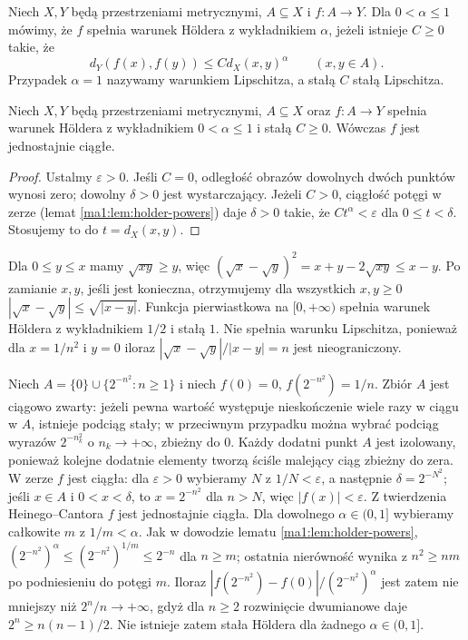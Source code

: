 \begin{definicja}
\label{ma1:def:holder-lipschitz}
Niech $X,Y$ będą przestrzeniami metrycznymi, $A\subseteq X$ i $f:A\to Y$. Dla $0<\alpha\le1$ mówimy, że $f$ spełnia warunek H\"oldera z wykładnikiem $\alpha$, jeżeli istnieje $C\ge0$ takie, że
\[
 d_Y(f(x),f(y))\le C d_X(x,y)^\alpha
 \qquad(x,y\in A).
\]
Przypadek $\alpha=1$ nazywamy warunkiem Lipschitza, a stałą $C$ stałą Lipschitza.
\end{definicja}
\begin{twierdzenie}
\label{ma1:thm:holder-uniform}
Niech $X,Y$ będą przestrzeniami metrycznymi, $A\subseteq X$ oraz $f:A\to Y$ spełnia warunek H\"oldera z wykładnikiem $0<\alpha\le1$ i stałą $C\ge0$. Wówczas $f$ jest jednostajnie ciągłe.
\end{twierdzenie}
\begin{proof}
Ustalmy $\varepsilon>0$. Jeśli $C=0$, odległość obrazów dowolnych dwóch punktów wynosi zero; dowolny $\delta>0$ jest wystarczający. Jeżeli $C>0$, ciągłość potęgi w zerze (lemat \ref{ma1:lem:holder-powers}) daje $\delta>0$ takie, że $Ct^\alpha<\varepsilon$ dla $0\le t<\delta$. Stosujemy to do $t=d_X(x,y)$.
\end{proof}
\begin{przyklad}
\label{ma1:ex:sqrt-holder}
Dla $0\le y\le x$ mamy $\sqrt{xy}\ge y$, więc
$(\sqrt x-\sqrt y)^2=x+y-2\sqrt{xy}\le x-y$.
Po zamianie $x,y$, jeśli jest konieczna, otrzymujemy dla wszystkich $x,y\ge0$
$|\sqrt x-\sqrt y|\le\sqrt{|x-y|}$.
Funkcja pierwiastkowa na $[0,+\infty)$ spełnia warunek H\"oldera z wykładnikiem $1/2$ i stałą $1$. Nie spełnia warunku Lipschitza, ponieważ dla $x=1/n^2$ i $y=0$ iloraz $|\sqrt x-\sqrt y|/|x-y|=n$ jest nieograniczony.
\end{przyklad}
\begin{przyklad}
\label{ma1:ex:uniform-no-holder}
Niech $A=\{0\}\cup\{2^{-n^2}:n\ge1\}$ i niech $f(0)=0$, $f(2^{-n^2})=1/n$. Zbiór $A$ jest ciągowo zwarty: jeżeli pewna wartość występuje nieskończenie wiele razy w ciągu w $A$, istnieje podciąg stały; w przeciwnym przypadku można wybrać podciąg wyrazów $2^{-n_k^2}$ o $n_k\to+\infty$, zbieżny do $0$. Każdy dodatni punkt $A$ jest izolowany, ponieważ kolejne dodatnie elementy tworzą ściśle malejący ciąg zbieżny do zera. W zerze $f$ jest ciągła: dla $\varepsilon>0$ wybieramy $N$ z $1/N<\varepsilon$, a następnie $\delta=2^{-N^2}$; jeśli $x\in A$ i $0<x<\delta$, to $x=2^{-n^2}$ dla $n>N$, więc $|f(x)|<\varepsilon$.
Z twierdzenia Heinego--Cantora $f$ jest jednostajnie ciągła. Dla dowolnego $\alpha\in(0,1]$ wybieramy całkowite $m$ z $1/m<\alpha$. Jak w dowodzie lematu \ref{ma1:lem:holder-powers}, $(2^{-n^2})^\alpha\le (2^{-n^2})^{1/m}\le 2^{-n}$ dla $n\ge m$; ostatnia nierówność wynika z $n^2\ge nm$ po podniesieniu do potęgi $m$. Iloraz $|f(2^{-n^2})-f(0)|/(2^{-n^2})^\alpha$ jest zatem nie mniejszy niż $2^n/n\to+\infty$, gdyż dla $n\ge2$ rozwinięcie dwumianowe daje $2^n\ge n(n-1)/2$. Nie istnieje zatem stała H\"oldera dla żadnego $\alpha\in(0,1]$.
\end{przyklad}


